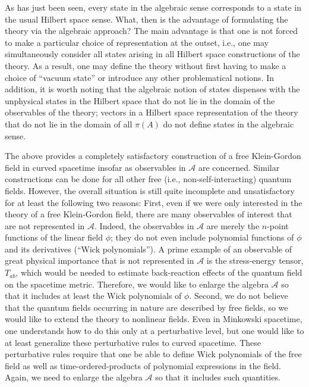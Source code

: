As has just been seen, every state in the algebraic sense corresponds
to a state in the usual Hilbert space sense. What, then is the
advantage of formulating the theory via the algebraic approach? The
main advantage is that one is not forced to make a particular choice
of representation at the outset, i.e., one may simultaneously consider
all states arising in all Hilbert space constructions of the
theory. As a result, one may define the theory without first having to
make a choice of ``vacuum state'' or introduce any other problematical
notions. In addition, it is worth noting that the
algebraic notion of states dispenses with the unphysical states in the
Hilbert space that do not lie in the domain of the observables of the
theory; vectors in a Hilbert space representation of the theory that
do not lie in the domain of all $\pi(A)$ do not define states in the
algebraic sense.

The above provides a completely satisfactory construction of a free
Klein-Gordon field in curved spacetime insofar as observables in
$\mathcal A$ are concerned. Similar constructions can be done for all
other free (i.e., non-self-interacting) quantum fields. However, the
overall situation is still quite incomplete and unsatisfactory for at
least the following two reasons: First, even if we were only
interested in the theory of a free Klein-Gordon field, there are many
observables of interest that are not represented in $\mathcal
A$. Indeed, the observables in $\mathcal A$ are merely the $n$-point
functions of the linear field $\phi$; they do not even include
polynomial functions of $\phi$ and its derivatives (``Wick
polynomials''). A prime example of an observable of great physical
importance that is not represented in $\mathcal A$ is the
stress-energy tensor, $T_{ab}$, which would be needed to estimate
back-reaction effects of the quantum field on the spacetime
metric. Therefore, we would like to enlarge the algebra $\mathcal A$
so that it includes at least the Wick polynomials of $\phi$. Second,
we do not believe that the quantum fields occurring in nature are
described by free fields, so we would like to extend the theory to
nonlinear fields. Even in Minkowski spacetime, one understands how to
do this only at a perturbative level, but one would like to at least
generalize these perturbative rules to curved spacetime. These
perturbative rules require that one be able to define Wick polynomials
of the free field as well as time-ordered-products of polynomial
expressions in the field. Again, we need to enlarge the algebra
$\mathcal A$ so that it includes such quantities.

